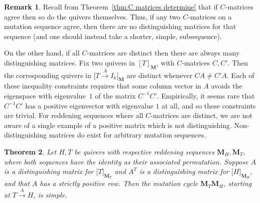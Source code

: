 \documentclass[11pt, letterpaper]{amsart}
\newtheorem{theorem}{Theorem}[section]
\theoremstyle{definition}
\newtheorem{remark}[theorem]{Remark}
\numberwithin{equation}{section}
\begin{document}
\begin{remark}
Recall from Theorem~\ref{thm:C matrices determine} that if $C$-matrices agree then so do the quivers themselves.
Thus, if any two $C$-matrices on a mutation sequence agree, then there are no distinguishing matrices for that sequence (and one should instead take a shorter, simple, subsequence).

On the other hand, if all $C$-matrices are distinct then there are always many distinguishing matrices. 
Fix two quivers in $[T]_{\mathbf M}$, with $C$-matrices $C, C'$.
Then the corresponding quivers in $\big [T \stackrel{A}{\rightarrow} I_k\big ]_{\mathbf{M}}$ are distinct whenever $CA \neq C'A$.
Each of these inequality constraints requires that some column vector in $A$ avoids the eigenspace with eigenvalue~$1$ of the matrix $C^{-1} C'$.
Empirically, it seems rare that $C^{-1} C'$ has a positive eigenvector with eigenvalue $1$ at all, and so these constraints are trivial.
For reddening sequences where all $C$-matrices are distinct, we are not aware of a single example of a positive matrix which is not distinguishing. 
Non-distinguishing matrices do exist for arbitrary mutation sequences. 
\end{remark}

\begin{theorem}
\label{thm:distinguishing minimal}
    Let $H,T$ be quivers with respective reddening sequences $\mathbf{M}_H, \mathbf{M}_T$, where both sequences have the identity as their associated permutation. 
    Suppose $A$ is a distinguishing matrix for $\big [T \big ]_{\mathbf{M}_T}$ and $A^T$ is a distinguishing matrix for $\big [H \big ]_{\mathbf{M}_H}$, and that $A$ has a strictly positive row. 
    Then the mutation cycle $\mathbf{M}_T\mathbf{M}_H$, starting at $T \stackrel{A}{\rightarrow} H$, is simple. 
\end{theorem}
\end{document}
